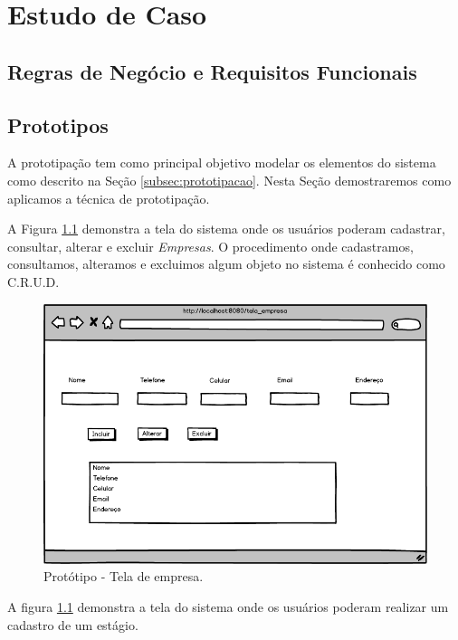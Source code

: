 \chapter{Estudo de Caso}
\label{cap:estudoCaso}

\section{Regras de Negócio e Requisitos Funcionais}
\label{sec:regrasNegocio}

\section{Prototipos}
\label{sec:prototiposSAGE}

A prototipação tem como principal objetivo modelar os elementos do sistema como
descrito na Seção \ref{subsec:prototipacao}.
Nesta Seção demostraremos como aplicamos a técnica de prototipação.

A Figura \ref{img:prototipo_empresa.png} demonstra a tela do sistema onde os
usuários poderam cadastrar, consultar, alterar e excluir {\it Empresas}. O
procedimento onde cadastramos, consultamos, alteramos e excluimos algum objeto
no sistema é conhecido como C.R.U.D.

\begin{figure}[!htb]
 \centering \includegraphics[scale=0.5]{imagens/prototipo_empresa.png}
 \caption{Protótipo - Tela de empresa.}
 \label{img:prototipo_empresa.png}
\end{figure}

A figura \ref{img:prototipo_empresa.png} demonstra a tela do sistema onde os
usuários poderam realizar um cadastro de um estágio.

